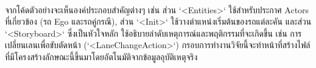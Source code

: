 \paragraph{}
จากโค้ดตัวอย่างจะเห็นองค์ประกอบสำคัญต่างๆ เช่น ส่วน `<Entities>` ใช้สำหรับประกาศ Actors ที่เกี่ยวข้อง (รถ Ego และรถคู่กรณี), ส่วน `<Init>` ใช้วางตำแหน่งเริ่มต้นของรถแต่ละคัน และส่วน `<Storyboard>` ซึ่งเป็นหัวใจหลัก ใช้อธิบายลำดับเหตุการณ์และพฤติกรรมที่จะเกิดขึ้น เช่น การเปลี่ยนเลนเพื่อขับตัดหน้า (`<LaneChangeAction>`) กรอบการทำงานวิจัยนี้จะทำหน้าที่สร้างไฟล์ที่มีโครงสร้างลักษณะนี้ขึ้นมาโดยอัตโนมัติจากข้อมูลอุบัติเหตุจริง